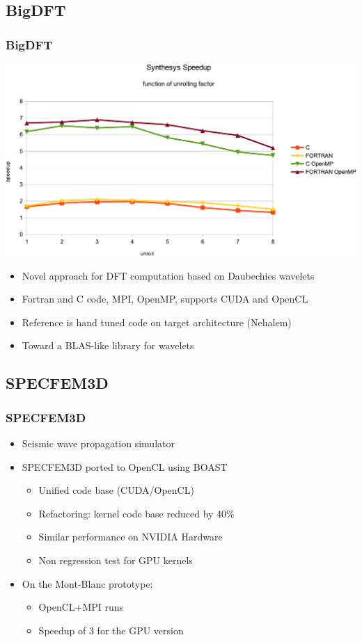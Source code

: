 \documentclass{beamer}
\begin{document}
\subsection{BigDFT}

\begin{frame}
  \frametitle{BigDFT}
  \begin{center}
    \includegraphics[scale=0.35]{Res_synthesis}
  \end{center}

 \begin{itemize}
  \item Novel approach for DFT computation based on Daubechies wavelets
  \item Fortran and C code, MPI, OpenMP, supports CUDA and OpenCL
   \item Reference is hand tuned code on target architecture (Nehalem)
    \item Toward a BLAS-like library for wavelets
  \end{itemize}
\end{frame}

\subsection{SPECFEM3D}

\begin{frame}
  \frametitle{SPECFEM3D}

  \begin{itemize}
   \item Seismic wave propagation simulator
    \item SPECFEM3D ported to OpenCL using BOAST
    \begin{itemize}
      \item Unified code base (CUDA/OpenCL)
      \item Refactoring: kernel code base reduced by 40\%
      \item Similar performance on NVIDIA Hardware
      \item Non regression test for GPU kernels
    \end{itemize}
    \item On the Mont-Blanc prototype:
    \begin{itemize}
      \item OpenCL+MPI runs
      \item Speedup of 3 for the GPU version
    \end{itemize}
  \end{itemize}
\end{frame}
\end{document}
